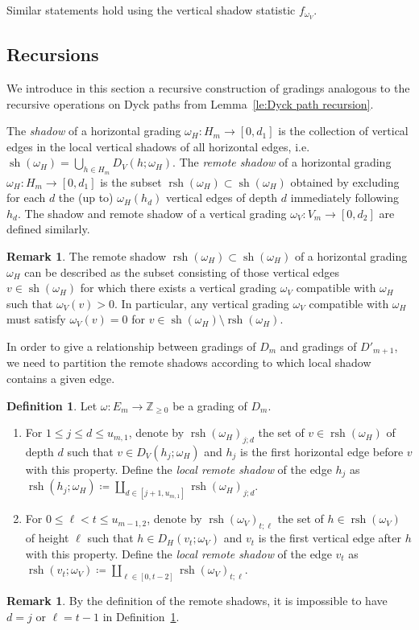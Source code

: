 \documentclass[10pt]{amsart}
\theoremstyle{definition}
\newtheorem{definition}[theorem]{Definition}
\newtheorem{remark}[theorem]{Remark}
\newcommand{\ie}{i.e.\ }
\newcommand{\ZZ}{\mathbb{Z}}
\DeclareMathOperator{\rsh}{rsh}
\DeclareMathOperator{\sh}{sh}
\begin{document}
Similar statements hold using the vertical shadow statistic $f_{\omega_V}$.

\subsection{Recursions}
\label{sec:recursions}
We introduce in this section a recursive construction of gradings analogous to the recursive operations on Dyck paths from Lemma~\ref{le:Dyck path recursion}. 

The \emph{shadow} of a horizontal grading $\omega_H:H_m\to[0,d_1]$ is the collection of vertical edges in the local vertical shadows of all horizontal edges, \ie $\sh(\omega_H)=\bigcup_{h\in H_m} D_V(h;\omega_H)$. 
The \emph{remote shadow} of a horizontal grading $\omega_H:H_m\to[0,d_1]$ is the subset $\rsh(\omega_H)\subset\sh(\omega_H)$ obtained by excluding for each $d$ the (up to) $\omega_H(h_d)$ vertical edges of depth $d$ immediately following $h_d$. 
The shadow and remote shadow of a vertical grading $\omega_V:V_m\to[0,d_2]$ are defined similarly.
\begin{remark}
 \label{rem:remote shadows}
 The remote shadow $\rsh(\omega_H)\subset\sh(\omega_H)$ of a horizontal grading $\omega_H$ can be described as the subset consisting of those vertical edges $v\in\sh(\omega_H)$ for which there exists a vertical grading $\omega_V$ compatible with $\omega_H$ such that $\omega_V(v)>0$.
 In particular, any vertical grading $\omega_V$ compatible with $\omega_H$ must satisfy $\omega_V(v)=0$ for $v\in\sh(\omega_H)\setminus\rsh(\omega_H)$.
\end{remark}

In order to give a relationship between gradings of $D_m$ and gradings of $D'_{m+1}$, we need to partition the remote shadows according to which local shadow contains a given edge. 
\begin{definition}
 \label{def:remote_shadows}
 Let $\omega:E_m\to\ZZ_{\ge0}$ be a grading of $D_m$.
 \begin{enumerate}[label=(\alph*)]
 \item For $1\le j\le d\le u_{m,1}$, denote by $\rsh(\omega_H)_{j;d}$ the set of $v\in\rsh(\omega_H)$ of depth $d$ such that $v\in D_V(h_j;\omega_H)$ and $h_j$ is the first horizontal edge before $v$ with this property. 
 Define the \emph{local remote shadow} of the edge $h_j$ as $\rsh(h_j;\omega_H)\coloneqq \coprod\limits_{d\in[j+1,u_{m,1}]}\rsh(\omega_H)_{j;d}$.
 \item For $0\le\ell<t\le u_{m-1,2}$, denote by $\rsh(\omega_V)_{t;\ell}$ the set of $h\in\rsh(\omega_V)$ of height $\ell$ such that $h\in D_H(v_t;\omega_V)$ and $v_t$ is the first vertical edge after $h$ with this property. 
 Define the \emph{local remote shadow} of the edge $v_t$ as $\rsh(v_t;\omega_V)\coloneqq \coprod\limits_{\ell\in[0,t-2]}\rsh(\omega_V)_{t;\ell}$.
 \end{enumerate}
\end{definition}
\begin{remark}
 By the definition of the remote shadows, it is impossible to have $d=j$ or $\ell=t-1$ in Definition~\ref{def:remote_shadows}.
\end{remark}
\end{document}
